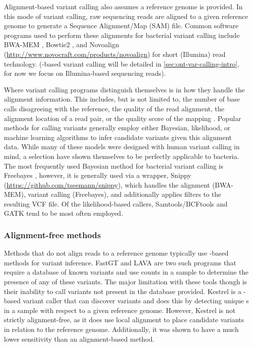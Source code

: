 Alignment-based variant calling also assumes a reference genome is provided. In this mode of variant calling, raw sequencing reads are aligned to a given reference genome to generate a Sequence Alignment/Map (SAM) file. Common software programs used to perform these alignments for bacterial variant calling include BWA-MEM \cite{li2013}, Bowtie2 \cite{bowtie2012}, and Novoalign (\url{http://www.novocraft.com/products/novoalign}) for short (Illumina) read technology. (\ont{}-based variant calling will be detailed in \autoref{sec:ont-var-calling-intro}, for now we focus on Illumina-based sequencing reads). 

Where variant calling programs distinguish themselves is in how they handle the alignment information. This includes, but is not limited to, the number of base calls disagreeing with the reference, the quality of the read alignment, the alignment location of a read pair, or the quality score of the mapping \cite{Olson2015}. Popular methods for calling variants generally employ either Bayesian, likelihood, or machine learning algorithms to infer candidate variants given this alignment data. While many of these models were designed with human variant calling in mind, a selection have shown themselves to be perfectly applicable to bacteria. The most frequently used Bayesian method for bacterial variant calling is Freebayes \cite{Garrison2012}, however, it is generally used via a wrapper, Snippy (\url{https://github.com/tseemann/snippy}), which handles the alignment (BWA-MEM), variant calling (Freebayes), and additionally applies filters to the resulting VCF file. Of the likelihood-based callers, Samtools/BCFtools \cite{bcftools2021,samtools2009} and GATK \cite{Poplin2018} tend to be most often employed. 

\subsubsection{Alignment-free methods}
Methods that do not align reads to a reference genome typically use \kmer{}-based methods for variant inference. FastGT \cite{fastgt2017} and LAVA \cite{lava2016} are two such programs that require a database of known variants and use \kmer{} counts in a sample to determine the presence of any of these variants. The major limitation with these tools though is their inability to call variants not present in the database provided. Kestrel \cite{kestrel2017} is a \kmer{}-based variant caller that can discover \denovo{} variants and does this by detecting unique \kmer{}s in a sample with respect to a given reference genome. However, Kestrel is not strictly alignment-free, as it does use local alignment to place candidate variants in relation to the reference genome. Additionally, it was shown to have a much lower sensitivity than an alignment-based method. 

